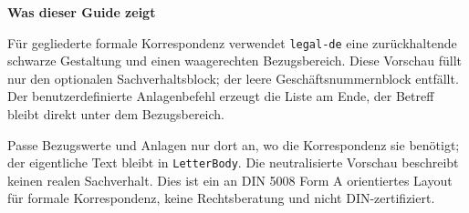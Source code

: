 

\UseRecipientManual
{}

\SetLegalGeschaeftsnummer{}

\begin{LetterBody}

\textbf{Was dieser Guide zeigt}

Für gegliederte formale Korrespondenz verwendet \texttt{legal-de} eine zurückhaltende schwarze Gestaltung und einen waagerechten Bezugsbereich. Diese Vorschau füllt nur den optionalen Sachverhaltsblock; der leere Geschäftsnummernblock entfällt. Der benutzerdefinierte Anlagenbefehl erzeugt die Liste am Ende, der Betreff bleibt direkt unter dem Bezugsbereich.

Passe Bezugswerte und Anlagen nur dort an, wo die Korrespondenz sie benötigt; der eigentliche Text bleibt in \texttt{LetterBody}. Die neutralisierte Vorschau beschreibt keinen realen Sachverhalt. Dies ist ein an DIN 5008 Form A orientiertes Layout für formale Korrespondenz, keine Rechtsberatung und nicht DIN-zertifiziert.

\end{LetterBody}
